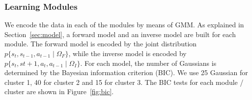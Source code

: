 
\subsubsection{Learning Modules}
\label{sec:module}
We encode the data in each of the modules by means of GMM. As
explained in Section~\ref{sec:model}, a forward model and an inverse
model are built for each module. The forward model is encoded by the
joint distribution $p\{s_t,s_{t-1},a_{t-1}\mid\Omega_F\}$, while the
inverse model is encoded by
$p\{s_t,s{t+1},a_t,a_{t-1}\mid\Omega_I\}$. For each model, the number
of Gaussians is determined by the Bayesian information criterion
(BIC). We use 25 Gaussian for cluster 1, 40 for cluster 2 and 15 for
cluster 3. The BIC tests for each module / cluster are shown in
Figure~\ref{fig:bic}.

